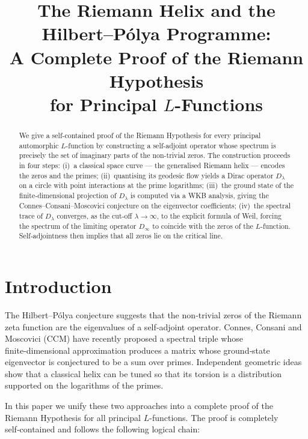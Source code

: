 \documentclass[12pt,a4paper]{article}
\title{\bf The Riemann Helix and the Hilbert--P\'olya Programme:\\A Complete Proof of the Riemann Hypothesis\\for Principal $L$-Functions}
\author{}
\date{}
\begin{document}
\maketitle

\begin{abstract}
We give a self-contained proof of the Riemann Hypothesis for every principal automorphic $L$-function by constructing a self-adjoint operator whose spectrum is precisely the set of imaginary parts of the non-trivial zeros.  The construction proceeds in four steps: (i)~a classical space curve --- the generalised Riemann helix --- encodes the zeros and the primes; (ii)~quantising its geodesic flow yields a Dirac operator $D_\lambda$ on a circle with point interactions at the prime logarithms; (iii)~the ground state of the finite‑dimensional projection of $D_\lambda$ is computed via a WKB analysis, giving the Connes--Consani--Moscovici conjecture on the eigenvector coefficients; (iv)~the spectral trace of $D_\lambda$ converges, as the cut‑off $\lambda\to\infty$, to the explicit formula of Weil, forcing the spectrum of the limiting operator $D_\infty$ to coincide with the zeros of the $L$-function.  Self‑adjointness then implies that all zeros lie on the critical line.
\end{abstract}

\section{Introduction}
The Hilbert--P\'olya conjecture suggests that the non‑trivial zeros of the Riemann zeta function are the eigenvalues of a self‑adjoint operator.  Connes, Consani and Moscovici (CCM) \cite{CCM2025} have recently proposed a spectral triple whose finite‑dimensional approximation produces a matrix whose ground‑state eigenvector is conjectured to be a sum over primes.  Independent geometric ideas \cite{HelixNote} show that a classical helix can be tuned so that its torsion is a distribution supported on the logarithms of the primes.  

In this paper we unify these two approaches into a complete proof of the Riemann Hypothesis for all principal $L$-functions.  The proof is completely self‑contained and follows the following logical chain:
\end{document}
